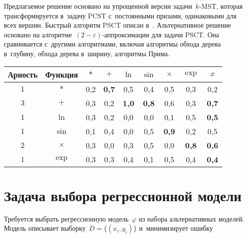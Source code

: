 \begin{multicols}{2}
Предлагаемое решение основано на упрощенной версии задачи~$k$-MST, которая 
трансформируется в~задачу PCST с~постоянными призами, одинаковыми для всех 
вершин. Быст\-рый алгоритм PSCT описан в~\cite{hegde2014fast}. Альтернативное 
решение основано на алгоритме~$(2-\varepsilon)$-аппроксимации для задачи PSCT. 
Она сравнивается с~другими алгоритмами, включая алгоритмы обхода дерева в~глубину, обхода дерева в~ширину, алгоритмы Прима.

\begin{table*}[b]\small  %
\vspace*{-12pt}
\begin{center}
        \parbox{300pt}{

}
    \label{restored_adjacency_matrix}
\vspace*{2ex}

        \begin{tabular}{|c|c|ccccccc|}
            \hline
            Арность&Функция&$\ast$&$+$&$\ln$&$\sin$&$\times$&$\exp$&$x$\\
            \hline
            $1$&$\ast$ &0,2&{\bf 0,7}&0,5&0,4&0,5&0,3&0,2\\
            $3$&$+$    &0,3&0,2&{\bf 1,0}&{\bf 0,8}&0,6&0,3&{\bf 0,7}\\
            $1$&$\ln$  &0,3&0,2&0,0&0,0&0,1&0,5&{\bf 0,5}\\
            $1$&$\sin$ &0,1&0,4&0,0&0,5&{\bf 0,9}&0,2&0,5\\
            $2$&$\times$&0,3&0,0&0,3&0,5&0,0&{\bf 0,8}&{\bf 0,6}\\
            $1$&$\exp$ &0,3&0,3&0,4&0,1&0,5&0,4&{\bf 0,4}\\
            \hline
        \end{tabular}
\end{center}
\end{table*}

\vspace*{-12pt}


\section{Задача выбора регрессионной модели}

\vspace*{-3pt}

Требуется выбрать регрессионную модель~$\varphi$ из набора альтернативных 
моделей. Модель описывает выборку~$D=\{(x_i,y_i)\}$ и~минимизирует ошибку


\end{multicols}
